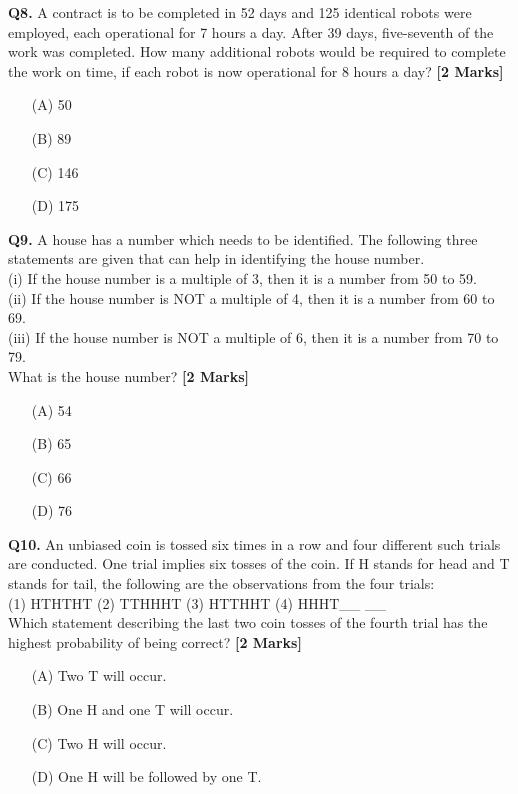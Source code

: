 \documentclass[11pt]{article}
\newcommand{\questionb}[2]{
    \noindent\textbf{Q#2.} #1 \hfill \textbf{[2 Marks]}
}
\begin{document}
\questionb{A contract is to be completed in 52 days and 125 identical robots were employed, each operational for 7 hours a day. After 39 days, five-seventh of the work was completed. How many additional robots would be required to complete the work on time, if each robot is now operational for 8 hours a day?}{8}
\begin{enumerate}
    \item[(A)] 50  
    \item[(B)] 89  
    \item[(C)] 146  
    \item[(D)] 175  
\end{enumerate}
\vspace{0.5cm}

\questionb{A house has a number which needs to be identified. The following three statements are given that can help in identifying the house number.\\
(i) If the house number is a multiple of 3, then it is a number from 50 to 59.\\
(ii) If the house number is NOT a multiple of 4, then it is a number from 60 to 69.\\
(iii) If the house number is NOT a multiple of 6, then it is a number from 70 to 79.\\
What is the house number?}{9}
\begin{enumerate}
    \item[(A)] 54  
    \item[(B)] 65  
    \item[(C)] 66  
    \item[(D)] 76  
\end{enumerate}
\vspace{0.5cm}

\questionb{An unbiased coin is tossed six times in a row and four different such trials are conducted. One trial implies six tosses of the coin. If H stands for head and T stands for tail, the following are the observations from the four trials: \\
(1) HTHTHT \quad (2) TTHHHT \quad (3) HTTHHT \quad (4) HHHT\_\_ \_\_ \\
Which statement describing the last two coin tosses of the fourth trial has the highest probability of being correct?}{10}
\begin{enumerate}
    \item[(A)] Two T will occur.  
    \item[(B)] One H and one T will occur.  
    \item[(C)] Two H will occur.  
    \item[(D)] One H will be followed by one T.  
\end{enumerate}
\vspace{0.5cm}
\end{document}
